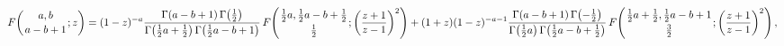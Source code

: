 \[\mathop{F\/}\nolimits\!\left({a,b\atop a-b+1};z\right)=(1-z)^{-a}\frac{\mathop%
{\Gamma\/}\nolimits\!\left(a-b+1\right)\mathop{\Gamma\/}\nolimits\!\left(%
\tfrac{1}{2}\right)}{\mathop{\Gamma\/}\nolimits\!\left(\tfrac{1}{2}a+\tfrac{1}%
{2}\right)\mathop{\Gamma\/}\nolimits\!\left(\tfrac{1}{2}a-b+1\right)}\mathop{F%
\/}\nolimits\!\left({\tfrac{1}{2}a,\tfrac{1}{2}a-b+\tfrac{1}{2}\atop\tfrac{1}{%
2}};\left(\frac{z+1}{z-1}\right)^{2}\right)+(1+z)(1-z)^{-a-1}\frac{\mathop{%
\Gamma\/}\nolimits\!\left(a-b+1\right)\mathop{\Gamma\/}\nolimits\!\left(-%
\tfrac{1}{2}\right)}{\mathop{\Gamma\/}\nolimits\!\left(\tfrac{1}{2}a\right)%
\mathop{\Gamma\/}\nolimits\!\left(\tfrac{1}{2}a-b+\tfrac{1}{2}\right)}\mathop{%
F\/}\nolimits\!\left({\tfrac{1}{2}a+\tfrac{1}{2},\tfrac{1}{2}a-b+1\atop\tfrac{%
3}{2}};\left(\frac{z+1}{z-1}\right)^{2}\right),\]